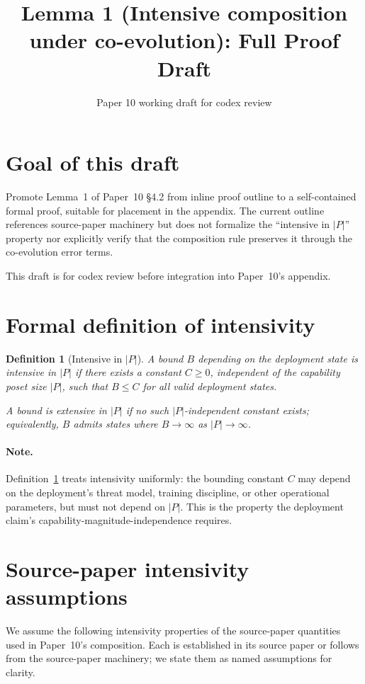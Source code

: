 \documentclass{article}
\title{Lemma 1 (Intensive composition under co-evolution): Full Proof Draft}
\author{Paper 10 working draft for codex review}
\date{}
\newtheorem{definition}{Definition}
\begin{document}
\maketitle

\section{Goal of this draft}

Promote Lemma~1 of Paper~10 \S4.2 from inline proof outline to a
self-contained formal proof, suitable for placement in the
appendix. The current outline references source-paper machinery but
does not formalize the ``intensive in $|P|$'' property nor
explicitly verify that the composition rule preserves it through
the co-evolution error terms.

This draft is for codex review before integration into Paper~10's
appendix.

\section{Formal definition of intensivity}

\begin{definition}[Intensive in $|P|$]
\label{def:intensive}
A bound $B$ depending on the deployment state is \emph{intensive in
$|P|$} if there exists a constant $C \geq 0$, independent of the
capability poset size $|P|$, such that $B \leq C$ for all valid
deployment states.

A bound is \emph{extensive in $|P|$} if no such $|P|$-independent
constant exists; equivalently, $B$ admits states where $B \to
\infty$ as $|P| \to \infty$.
\end{definition}

\paragraph{Note.} Definition~\ref{def:intensive} treats intensivity
uniformly: the bounding constant $C$ may depend on the deployment's
threat model, training discipline, or other operational parameters,
but must not depend on $|P|$. This is the property the deployment
claim's capability-magnitude-independence requires.

\section{Source-paper intensivity assumptions}

We assume the following intensivity properties of the source-paper
quantities used in Paper~10's composition. Each is established in
its source paper or follows from the source-paper machinery; we
state them as named assumptions for clarity.
\end{document}
